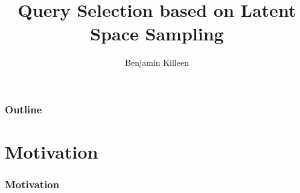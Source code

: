 \documentclass[10pt, usenames, dvipsnames, table]{beamer}
\title{#1}
\subtitle{}
\author{}
\institute{}
\date{}
\title{Query Selection based on Latent Space Sampling}
\author{Benjamin Killeen}
\date{}
\begin{document}
\begin{frame}
  \titlepage
\end{frame}

\begin{frame}
  \frametitle{Outline}
  \tableofcontents
\end{frame}


\section{Motivation}
\label{sec:motivation}
\begin{frame}
  \frametitle{Motivation}
  
\end{frame}
\end{document}
